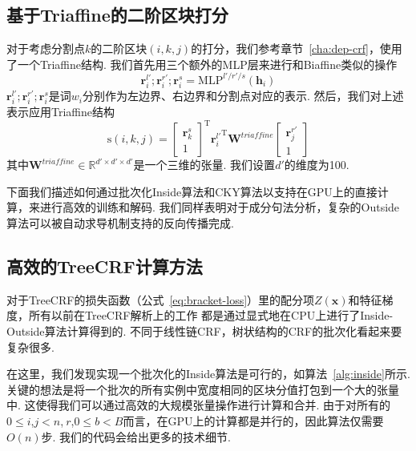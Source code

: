 \subsection{基于Triaffine的二阶区块打分}
对于考虑分割点$k$的二阶区块$(i,k,j)$的打分，我们参考章节~\ref{cha:dep-crf}，使用了一个Triaffine结构.
我们首先用三个额外的MLP层来进行和Biaffine类似的操作
\begin{equation}
  \label{con-mlp-sib}
  \mathbf{r}_i^{l'}; \mathbf{r}_i^{r'}; \mathbf{r}_i^{s} =\mathrm{MLP}^{l'/r'/s} \left( \mathbf{h}_i \right)
\end{equation}
$\mathbf{r}_i^{l'}; \mathbf{r}_i^{r'}; \mathbf{r}_i^{s}$是词$w_i$分别作为左边界、右边界和分割点对应的表示.
然后，我们对上述表示应用Triaffine结构
\begin{equation} \label{eq:con-triaffine}
  \mathrm{s}(i,k,j) =
  \left[
    \begin{array}{c}
      \mathbf{r}_{k}^{s} \\
      1
    \end{array}
    \right]^\mathrm{T}
  {\mathbf{r}_{i}^{l'}}^\mathrm{T}
  \mathbf{W}^\textit{triaffine}
  \left[
    \begin{array}{c}
      \mathbf{r}_{j}^{r'} \\
      1
    \end{array}
    \right]
\end{equation}
其中$\mathbf{W}^\textit{triaffine} \in \mathbb{R}^{d' \times d' \times d'}$是一个三维的张量.
我们设置$d'$的维度为100.



下面我们描述如何通过批次化Inside算法和CKY算法以支持在GPU上的直接计算，来进行高效的训练和解码.
我们同样表明对于成分句法分析，复杂的Outside算法可以被自动求导机制支持的反向传播完成.

\subsection{高效的TreeCRF计算方法}

对于TreeCRF的损失函数（公式~\ref{eq:bracket-loss}）里的配分项$Z(\boldsymbol{x})$和特征梯度，所有以前在TreeCRF解析上的工作 \citep{finkel-etal-2008-efficient,durrett-klein-2015-neural}都是通过显式地在CPU上进行了Inside-Outside算法计算得到的.
不同于线性链CRF，树状结构的CRF的批次化看起来要复杂很多.

在这里，我们发现实现一个批次化的Inside算法是可行的，如算法~\ref{alg:inside}所示.
关键的想法是将一个批次的所有实例中宽度相同的区块分值打包到一个大的张量中.
这使得我们可以通过高效的大规模张量操作进行计算和合并.
由于对所有的$0 \le i$,$j<n$,$~r$,$0\le b<B$而言，在GPU上的计算都是并行的，因此算法仅需要$O(n)$步.
我们的代码会给出更多的技术细节.

